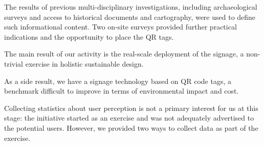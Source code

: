 \documentclass[sustainability,article,submit,pdftex,moreauthors]{Definitions/mdpi}
\begin{document}
The results of previous multi-disciplinary investigations, including archaeological surveys and access to historical documents and cartography, were used to define such informational content. Two on-site surveys provided further practical indications and the opportunity to place the QR tags.

The main result of our activity is the real-scale deployment of the signage, a non-trivial exercise in holistic sustainable design.

As a side result, we have a signage technology based on QR code tags, a benchmark difficult to improve in terms of environmental impact and cost.




Collecting statistics about user perception is not a primary interest for us at this stage: the initiative started as an exercise and was not adequately advertised to the potential users. However, we provided two ways to collect data as part of the exercise.
\end{document}
